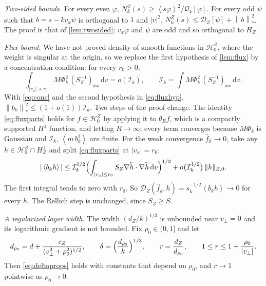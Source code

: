 \documentclass[11pt]{article}
\newcommand{\dd}{\,\mathrm d}
\newcommand{\av}[1]{\left\langle #1\right\rangle}
\newcommand{\D}{\mathcal D}
\newcommand{\HH}{\mathcal H}
\newcommand{\nstar}[1]{\left\|#1\right\|_*}
\theoremstyle{definition}
\theoremstyle{remark}
\numberwithin{equation}{section}
\begin{document}
\emph{Two-sided bounds.} For every even $\varphi$,
$N_k^Z(s)\geq\av{s\varphi}^2/\mathcal Q_k[\varphi]$. For every odd $\psi$
such that $b=s-kv_x\psi$ is orthogonal to $1$ and $|v|^2$,
$N_k^Z(s)\leq\D_Z[\psi]+\nstar b^2$. The proof is that of
\cref{lem:twosided}; $v_x\varphi$ and $\psi$ are odd and so orthogonal to
$H_Z$.

\emph{Flux bound.} We have not proved density of smooth functions in
$\HH_0^Z$, where the weight is singular at the origin, so we replace the
first hypothesis of \cref{lem:flux} by a concentration condition: for
every $r_0>0$,
\begin{equation}
 \int_{|v_x|>r_0}M\Phi_k^2\,(S_Z^{-1})_{xx}\dd v=o(\mathcal I_k),\qquad
 \mathcal I_k=\int M\Phi_k^2\,(S_Z^{-1})_{xx}\dd v .
 \label{eq:conc}
\end{equation}
With \eqref{eq:conc} and the second hypothesis in \eqref{eq:fluxhyp},
$\nstar{b_k}^2\leq(1+o(1))\mathcal I_k$. Two steps of the proof change.
The identity \eqref{eq:fluxparts} holds for $f\in\HH_0^Z$ by applying it
to $\theta_Rf$, which is a compactly supported $H^1$ function, and letting
$R\to\infty$; every term converges because $M\Phi_k$ is Gaussian and
$\mathcal I_k$, $\av{m\,b_k^2}$ are finite. For the weak convergence
$\hat f_k\to0$, take any $h\in\HH_0^Z\cap H_Z^\perp$ and split
\eqref{eq:fluxparts} at $|v_x|=r_0$:
\[
 |\av{b_kh}|\leq\mathcal I_k^{1/2}\Bigl(\int_{|v_x|\leq r_0}
   S_Z\nabla\widetilde h\cdot\nabla\widetilde h\dd v\Bigr)^{1/2}
  +o\bigl(\mathcal I_k^{1/2}\bigr)\,\|h\|_{Z,0}.
\]
The first integral tends to zero with $r_0$. So
$\D_Z(\hat f_k,h)=s_k^{-1/2}\av{b_kh}\to0$ for every $h$. The Rellich step
is unchanged, since $S_Z\geq S$.

\emph{A regularized layer width.} The width $(d_Z/k)^{1/3}$ is unbounded
near $v_\perp=0$ and its logarithmic gradient is not bounded. Fix
$\rho_0\in(0,1]$ and let
\[
 d_{\rho_0}=d+\frac{c_Z}{(v_\perp^2+\rho_0^2)^{1/2}},\qquad
 \delta=\Bigl(\frac{d_{\rho_0}}{k}\Bigr)^{1/3},\qquad
 r=\frac{d_Z}{d_{\rho_0}},\qquad 1\leq r\leq1+\frac{\rho_0}{|v_\perp|}.
\]
Then \eqref{eq:deltaprops} holds with constants that depend on $\rho_0$,
and $r\to1$ pointwise as $\rho_0\to0$.
\end{document}
